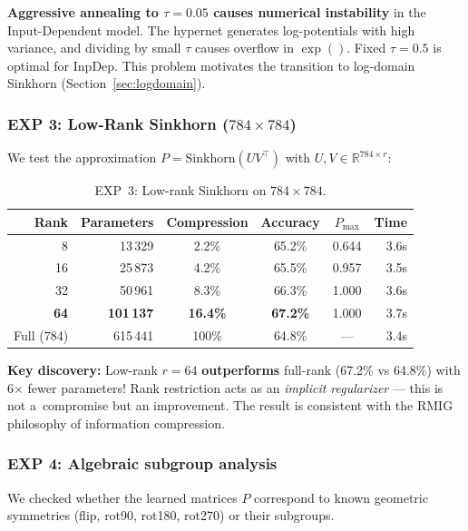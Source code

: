 \documentclass[11pt,a4paper]{report}
\begin{document}
\textbf{Aggressive annealing to $\tau=0.05$ causes numerical instability} in the Input-Dependent model. The hypernet generates log-potentials with high variance, and dividing by small $\tau$ causes overflow in $\exp()$. Fixed $\tau=0.5$ is optimal for InpDep. This problem motivates the transition to log-domain Sinkhorn (Section~\ref{sec:logdomain}).

\subsubsection*{EXP 3: Low-Rank Sinkhorn ($784 \times 784$)}

We test the approximation $P = \text{Sinkhorn}(UV^\top)$ with $U, V \in \mathbb{R}^{784 \times r}$:

\begin{table}[h]
\centering
\caption{EXP~3: Low-rank Sinkhorn on $784 \times 784$.}
\begin{tabular}{rrcccr}
\hline
\textbf{Rank} & \textbf{Parameters} & \textbf{Compression} & \textbf{Accuracy} & \textbf{$P_{\max}$} & \textbf{Time} \\
\hline
8   & 13\,329  & 2.2\%  & 65.2\% & 0.644 & 3.6s \\
16  & 25\,873  & 4.2\%  & 65.5\% & 0.957 & 3.5s \\
32  & 50\,961  & 8.3\%  & 66.3\% & 1.000 & 3.6s \\
\textbf{64} & \textbf{101\,137} & \textbf{16.4\%} & \textbf{67.2\%} & 1.000 & 3.7s \\
Full (784) & 615\,441 & 100\% & 64.8\% & --- & 3.4s \\
\hline
\end{tabular}
\end{table}

\textbf{Key discovery:} Low-rank $r=64$ \textbf{outperforms} full-rank (67.2\% vs 64.8\%) with 6$\times$ fewer parameters! Rank restriction acts as an \emph{implicit regularizer} --- this is not a~compromise but an improvement. The result is consistent with the RMIG philosophy of information compression.

\subsubsection*{EXP 4: Algebraic subgroup analysis}

We checked whether the learned matrices $P$ correspond to known geometric symmetries (flip, rot90, rot180, rot270) or their subgroups.
\end{document}
